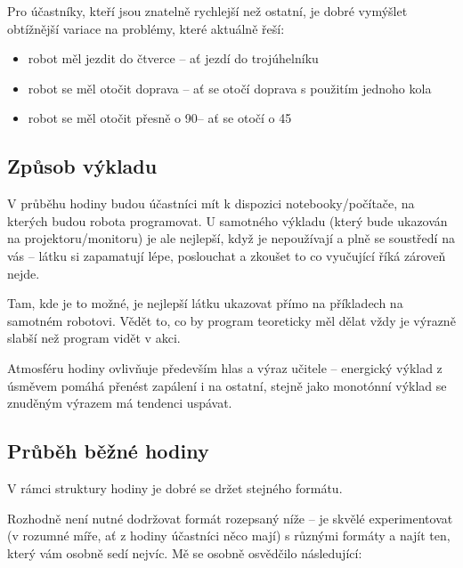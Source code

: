 \vspace{\baselineskip}

Pro účastníky, kteří jsou znatelně rychlejší než ostatní, je dobré vymýšlet obtížnější variace na problémy, které aktuálně řeší:
\begin{itemize}
	\item robot měl jezdit do čtverce -- ať jezdí do trojúhelníku
	\item robot se měl otočit doprava -- ať se otočí doprava s použitím jednoho kola
	\item robot se měl otočit přesně o 90\degree -- ať se otočí o 45\degree
\end{itemize}

\subsection{Způsob výkladu}
V průběhu hodiny budou účastníci mít k dispozici notebooky/počítače, na kterých budou robota programovat. U samotného výkladu (který bude ukazován na projektoru/monitoru) je ale nejlepší, když je nepoužívají a plně se soustředí na vás -- látku si zapamatují lépe, poslouchat a zkoušet to co vyučující říká zároveň nejde.

Tam, kde je to možné, je nejlepší látku ukazovat přímo na příkladech na samotném robotovi. Vědět to, co by program teoreticky měl dělat vždy je výrazně slabší než program vidět v akci.

Atmosféru hodiny ovlivňuje především hlas a výraz učitele -- energický výklad z úsměvem pomáhá přenést zapálení i na ostatní, stejně jako monotónní výklad se znuděným výrazem má tendenci uspávat.

\subsection{Průběh běžné hodiny}
V rámci struktury hodiny je dobré se držet stejného formátu.

Rozhodně není nutné dodržovat formát rozepsaný níže -- je skvělé experimentovat (v rozumné míře, ať z hodiny účastníci něco mají) s různými formáty a najít ten, který vám osobně sedí nejvíc. Mě se osobně osvědčilo následující:

